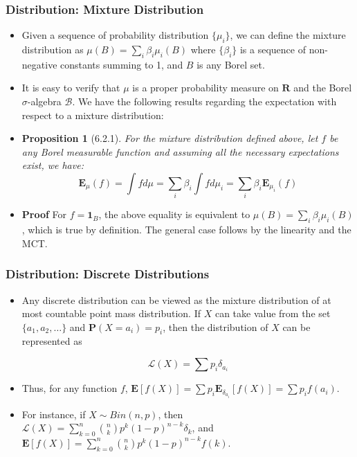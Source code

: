 \documentclass[handout]{beamer}
\newtheorem{Proposition}[theorem]{Proposition}%
\newcommand{\BP}{\mathbf{P}}
\newcommand{\BE}{\mathbf{E}}
\newcommand{\BI}{\mathbf{1}}
\begin{document}
\frame
{
  \frametitle{Distribution: Mixture Distribution}

   \begin{itemize}
  
                \item<1-> Given a sequence of probability distribution $\{\mu_i \}$, we can define the mixture distribution as $\mu(B)=\sum_i \beta_i \mu_i (B)$ where $\{\beta_i\}$ is a sequence of non-negative constants summing to 1, and $B$ is any Borel set. 
                
                                \item<2->  It is easy to verify that $\mu$ is a proper probability measure on $\mathbf{R}$ and the Borel $\sigma$-algebra $\mathcal{B}$. We have the following results regarding the expectation with respect to a mixture distribution:
                                
                                

               \item<3->[] \begin{Proposition}[6.2.1] For the mixture distribution defined above, let $f$ be any Borel measurable function and assuming all the necessary expectations exist, we have:
                          $$\BE_{\mu}(f)=\int f d\mu =\sum_i \beta_i \int f d\mu_i=\sum_i  \beta_i \BE_{\mu_i} (f)$$
               
                \end{Proposition}
                                                
                                                \item<4-> \textbf{Proof} For $f=\BI_B$, the above equality is equivalent to $\mu(B)=\sum_i \beta_i \mu_i (B)$, which is true by definition. The general case follows by the linearity and the MCT. \end{itemize}
}



\frame
{
  \frametitle{Distribution: Discrete Distributions}

   \begin{itemize}
  
                \item<1-> Any discrete distribution can be viewed as the mixture distribution of at most countable point mass distribution. If $X$ can take value from the set $\{a_1, a_2, \ldots\}$ and $\BP(X=a_i)=p_i$, then the distribution of $X$ can be represented as 
                
                $$\mathcal{L} (X)=\sum p_i \delta_{a_i}$$ 
                
             \item<2->  Thus, for any function $f$, $\BE[f(X)]=\sum p_i \BE_{\delta_{a_i}} [f(X)]=\sum p_i f(a_i)$.
                                
                                
             \item<3->  For instance, if $X\sim Bin(n,p)$, then $\mathcal{L} (X)=\sum_{k=0}^n {n \choose k} p^k(1-p)^{n-k} \delta_{k}$, and $\BE[f(X)]=\sum_{k=0}^n {n \choose k} p^k(1-p)^{n-k} f(k)$.
\end{itemize}
}
\end{document}
